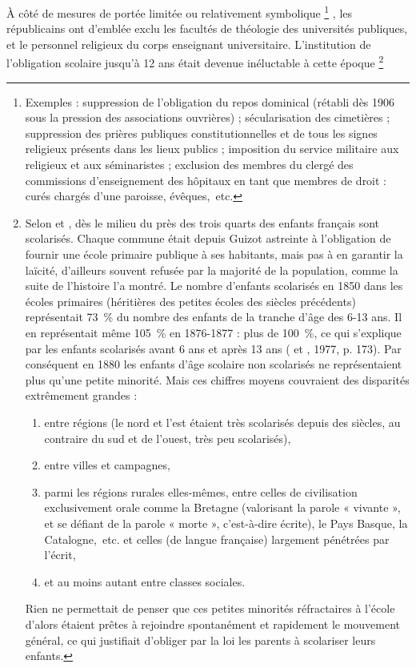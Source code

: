  À côté de mesures de portée limitée ou relativement symbolique%
\footnote{Exemples : suppression de l'obligation du repos dominical (rétabli dès 1906 sous la pression des associations ouvrières) ; sécularisation des cimetières ; suppression des prières publiques constitutionnelles et de tous les signes religieux présents dans les lieux publics ; imposition du service militaire aux religieux et aux séminaristes ; exclusion des membres du clergé des commissions d'enseignement des hôpitaux en tant que membres de droit : curés chargés d'une paroisse, évêques,~etc.}%
, les républicains ont d'emblée exclu les facultés de théologie des universités publiques, et le personnel religieux du corps enseignant universitaire. L'institution de l'obligation scolaire jusqu'à 12 ans était devenue inéluctable à cette époque%
\footnote{Selon  et , dès le milieu du  près des trois quarts des enfants français sont scolarisés. Chaque commune était depuis Guizot astreinte à l'obligation de fournir une école primaire publique à ses habitants, mais pas à en garantir la laïcité, d'ailleurs souvent refusée par la majorité de la population, comme la suite de l'histoire l'a montré. Le nombre d'enfants scolarisés en 1850 dans les écoles primaires (héritières des petites écoles des siècles précédents) représentait 73~\% du nombre des enfants de la tranche d'âge des 6-13 ans. Il en représentait même 105~\% en 1876-1877 : plus de 100~\%, ce qui s'explique par les enfants scolarisés avant 6 ans et après 13 ans ( et , 1977, p. 173). Par conséquent en 1880 les enfants d'âge scolaire non scolarisés ne représentaient plus qu'une petite minorité. Mais ces chiffres moyens couvraient des disparités extrêmement grandes :
\begin{enumerate}[label=\alph*.,itemsep=0pt]
\item entre régions (le nord et l'est étaient très scolarisés depuis des siècles, au contraire du sud et de l'ouest, très peu scolarisés),
\item entre villes et campagnes,
\item parmi les régions rurales elles-mêmes, entre celles de civilisation exclusivement orale comme la Bretagne (valorisant la parole « vivante », et se défiant de la parole « morte », c'est-à-dire écrite), le Pays Basque, la Catalogne,~etc. et celles (de langue française) largement pénétrées par l'écrit,
\item et au moins autant entre classes sociales.
\end{enumerate}

 Rien ne permettait de penser que ces petites minorités réfractaires à l'école d'alors étaient prêtes à rejoindre spontanément et rapidement le mouvement général, ce qui justifiait d'obliger par la loi les parents à scolariser leurs enfants.}%
